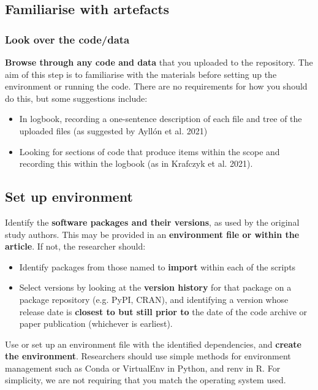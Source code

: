 \vspace{0.5cm}
\subsection{Familiarise with artefacts}

\subsubsection{Look over the code/data}

\textbf{Browse through any code and data} that you uploaded to the repository. The aim of this step is to familiarise with the materials before setting up the environment or running the code. There are no requirements for how you should do this, but some suggestions include:
\begin{itemize}
    \item In logbook, recording a one-sentence description of each file and tree of the uploaded files (as suggested by Ayllón et al. 2021\autocite{ayllon_keeping_2021})
    \item Looking for sections of code that produce items within the scope and recording this within the logbook (as in Krafczyk et al. 2021\cite{krafczyk_learning_2021}).
\end{itemize}

\newpage
\subsection{Set up environment}

Identify the \textbf{software packages and their versions}, as used by the original study authors. This may be provided in an \textbf{environment file or within the article}. If not, the researcher should:
\begin{itemize}
    \item Identify packages from those named to \textbf{import} within each of the scripts
    \item Select versions by looking at the \textbf{version history} for that package on a package repository (e.g. PyPI, CRAN), and identifying a version whose release date is \textbf{closest to but still prior to} the date of the code archive or paper publication (whichever is earliest).
\end{itemize}

Use or set up an environment file with the identified dependencies, and \textbf{create the environment}. Researchers should use simple methods for environment management such as Conda or VirtualEnv in Python, and renv in R. For simplicity, we are not requiring that you match the operating system used.

